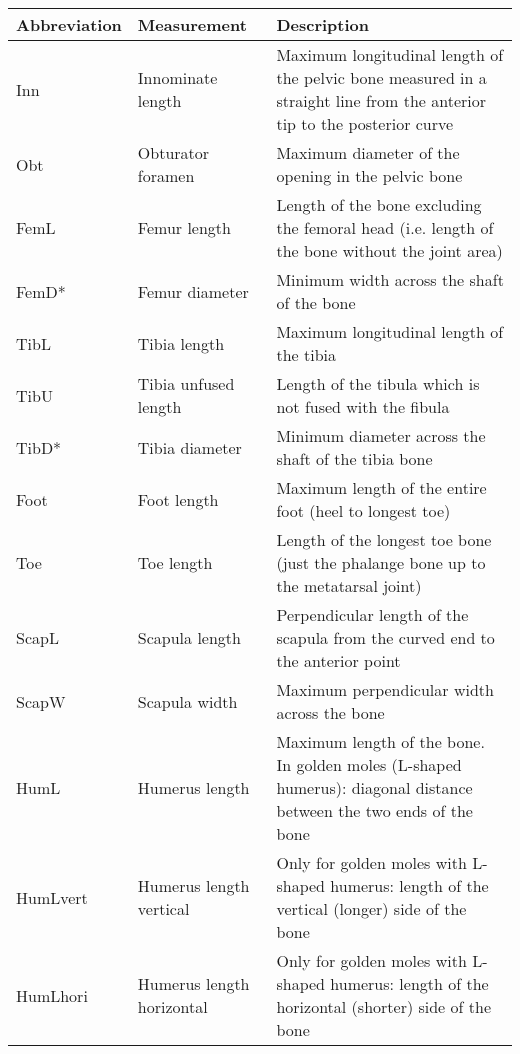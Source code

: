 

\begin{longtable}{p{2.4cm}p{3.2cm}p{9.5cm}}
\hline
\textbf{Abbreviation} & \textbf{Measurement} & \textbf{Description}\\
\hline
Inn & Innominate length & Maximum longitudinal length of the pelvic bone measured in a straight line from the anterior tip to the posterior curve \\ 
Obt & Obturator foramen & Maximum diameter of the opening in the pelvic bone \\
FemL & Femur length & Length of the bone excluding the femoral head (i.e. length of the bone without the joint area)  \\
FemD* & Femur diameter & Minimum width across the shaft of the bone \\
TibL & Tibia length & Maximum longitudinal length of the tibia  \\
TibU & Tibia unfused length & Length of the tibula which is not fused with the fibula \\
TibD* & Tibia diameter & Minimum diameter across the shaft of the tibia bone \\
Foot & Foot length & Maximum length of the entire foot (heel to longest toe) \\
Toe & Toe length & Length of the longest toe bone (just the phalange bone up to the metatarsal joint) \\
ScapL & Scapula length & Perpendicular length of the scapula from the curved end to the anterior point  \\
ScapW & Scapula width & Maximum perpendicular width across the bone \\
HumL & Humerus length & Maximum length of the bone. In golden moles (L-shaped humerus): diagonal distance between the two ends of the bone  \\
HumLvert & Humerus length vertical & Only for golden moles with L-shaped humerus: length of the vertical (longer) side of the bone \\
HumLhori & Humerus length horizontal & Only for golden moles with L-shaped humerus: length of the horizontal (shorter) side of the bone \\

\end{longtable}
